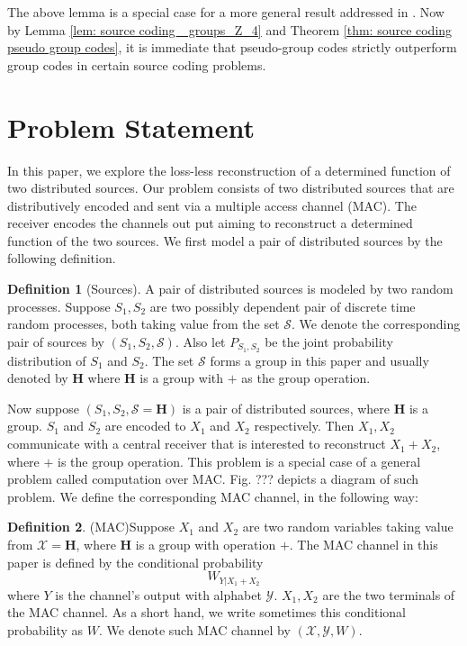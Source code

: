 \documentclass[conference]{IEEEtran}
\theoremstyle{plain}
\theoremstyle{definition}
\newtheorem{definition}{Definition}
\theoremstyle{remark}
\begin{document}
The above lemma is a special case for a more general result addressed in \cite{Aria-group}. Now by Lemma \ref{lem: source coding_ groups_Z_4} and Theorem \ref{thm: source coding pseudo group codes}, it is immediate that pseudo-group codes strictly outperform group codes in certain source coding problems.







\section{Problem Statement}
In this paper, we explore the loss-less reconstruction of a determined function of two distributed sources. Our problem consists of two distributed sources that are distributively encoded and sent via a  multiple access channel (MAC). The receiver encodes the channels out put aiming to reconstruct a determined function of the two sources. We first model a pair of distributed sources by the following definition.


\begin{definition}[Sources]
A pair of distributed sources is modeled by two random processes. Suppose $S_1, S_2$ are two possibly dependent pair of discrete time random processes, both taking value from the set $\mathcal{S}$. We denote the corresponding pair of sources by $(S_1,S_2, \mathcal{S})$. Also let $P_{S_1,S_2}$ be the joint probability distribution of $S_1$ and $S_2$. The set $\mathcal{S}$ forms a group in this paper and usually denoted by $\mathbf{H}$ where $\mathbf{H}$ is a group with $+$ as the group operation. 
\end{definition}

Now suppose $(S_1,S_2,\mathcal{S}=\mathbf{H})$ is a pair of distributed sources, where $\mathbf{H}$ is a group. $S_1$ and $S_2$ are encoded to $X_1$ and $X_2$ respectively. Then $X_1, X_2$ communicate with a central receiver that is interested to reconstruct $X_1+X_2$, where $+$ is the group operation. This problem is a special case of a general problem called computation over MAC. Fig. ??? depicts a diagram of such problem. We define the corresponding MAC channel, in the following way: 


\begin{definition}(MAC)\label{def: MAC}
Suppose $X_1$ and $X_2$ are two random variables taking value from $\mathcal{X}=\mathbf{H}$, where $\mathbf{H}$ is a group with operation $+$. The MAC channel in this paper is defined by the conditional probability 
\begin{equation*}
W_{Y|X_1+X_2}
\end{equation*}
where $Y$ is the channel's output with alphabet $\mathcal{Y}$. $X_1, X_2$ are the two terminals of the MAC channel. As a short hand, we write sometimes this conditional probability as $W$. We denote such MAC channel by $(\mathcal{X},\mathcal{Y},W)$. 
\end{definition}
\end{document}
